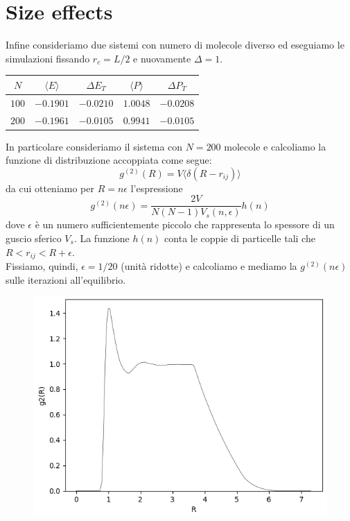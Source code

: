 \documentclass[a4paper,11pt]{article}
\begin{document}
\section*{Size effects}
\noindent Infine consideriamo due sistemi con numero di molecole diverso ed eseguiamo le simulazioni fissando $r_c=L/2$ e nuovamente $\Delta =1$.
\begin{table}[H]
	\centering
	\begin{tabular}{ccccc} 
		\hline
		$N$ & $\langle E \rangle $ & $\Delta E_T$ & $ \langle P \rangle $ & $\Delta P_T$\\
		\hline
		$100$	&	$-0.1901$	&	$-0.0210$	&	$1.0048$	&	$-0.0208$\\
		$200$	&	$-0.1961$	&	$-0.0105$	&	$0.9941$	&	$-0.0105$\\
		\hline
	\end{tabular}
\end{table}
\medskip
\noindent In particolare consideriamo il sistema con $N=200$ molecole e calcoliamo la funzione di distribuzione accoppiata come segue:
\begin{equation*}
	g^{(2)}(R) =V \langle \delta (R-r_{ij}) \rangle
\end{equation*}
\medskip
da cui otteniamo per $R=n \epsilon$ l'espressione
\begin{equation*}
g^{(2)}(n \epsilon) = \frac{2V}{N(N-1) V_s(n, \epsilon)} h(n)
\end{equation*}
\medskip
dove $\epsilon$ è un numero sufficientemente piccolo che rappresenta lo spessore di un guscio sferico $V_s$. La funzione $h(n)$ conta le coppie di particelle tali che $R<r_{ij}<R+\epsilon$. \\
Fissiamo, quindi, $\epsilon = 1/20$ (unità ridotte) e calcoliamo e mediamo la $g^{(2)}(n \epsilon)$ sulle iterazioni all'equilibrio.
\begin{figure}[H]
	\centering 
	{\includegraphics[width=0.8\linewidth]{graficoG2}}
\end{figure}
\medskip
\end{document}
